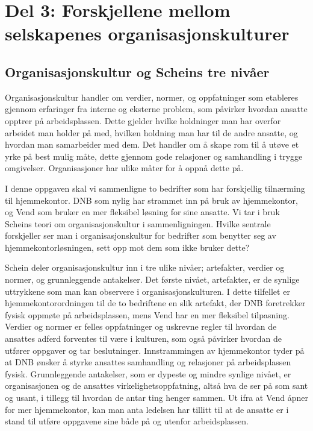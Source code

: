 \section{Del 3: Forskjellene mellom selskapenes organisasjonskulturer}

\subsection{Organisasjonskultur og Scheins tre nivåer}

Organisasjonskultur handler om verdier, normer, og oppfatninger som etableres gjennom erfaringer fra interne og eksterne problem, som påvirker hvordan ansatte opptrer på arbeidsplassen. Dette gjelder hvilke holdninger man har overfor arbeidet man holder på med, hvilken holdning man har til de andre ansatte, og hvordan man samarbeider med dem. Det handler om å skape rom til å utøve et yrke på best mulig måte, dette gjennom gode relasjoner og samhandling i trygge omgivelser. Organisasjoner har ulike måter for å oppnå dette på.

I denne oppgaven skal vi sammenligne to bedrifter som har forskjellig tilnærming til hjemmekontor. DNB som nylig har strammet inn på bruk av hjemmekontor, og Vend som bruker en mer fleksibel løsning for sine ansatte. Vi tar i bruk Scheins teori om organisasjonskultur i sammenligningen. Hvilke sentrale forskjeller ser man i organisasjonskultur for bedrifter som benytter seg av hjemmekontorløsningen, sett opp mot dem som ikke bruker dette?

Schein deler organisasjonskultur inn i tre ulike nivåer; artefakter, verdier og normer, og grunnleggende antakelser. Det første nivået, artefakter, er de synlige uttrykkene som man kan observere i organisasjonskulturen. I dette tilfellet er hjemmekontorordningen til de to bedriftene en slik artefakt, der DNB foretrekker fysisk oppmøte på arbeidsplassen, mens Vend har en mer fleksibel tilpasning. Verdier og normer er felles oppfatninger og uskrevne regler til hvordan de ansattes adferd forventes til være i kulturen, som også påvirker hvordan de utfører oppgaver og tar beslutninger. Innstrammingen av hjemmekontor tyder på at DNB ønsker å styrke ansattes samhandling og relasjoner på arbeidsplassen fysisk. Grunnleggende antakelser, som er dypeste og mindre synlige nivået, er organisasjonen og de ansattes virkelighetsoppfatning, altså hva de ser på som sant og usant, i tillegg til hvordan de antar ting henger sammen. Ut ifra at Vend åpner for mer hjemmekontor, kan man anta ledelsen har tillitt til at de ansatte er i stand til utføre oppgavene sine både på og utenfor arbeidsplassen.


